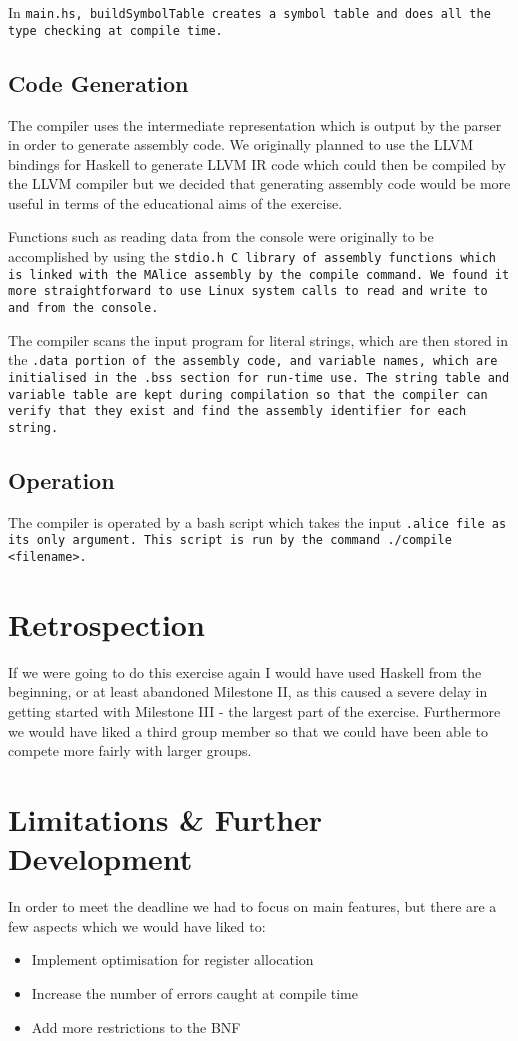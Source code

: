 \documentclass[11pt]{article}
\begin{document}
In \tt main.hs\rm, \tt buildSymbolTable \rm creates a symbol table and does all the type checking at compile time. 

\subsection{Code Generation}
The compiler uses the intermediate representation which is output by the parser in order to generate assembly code. We originally planned to use the LLVM bindings for Haskell to generate LLVM IR code which could then be compiled by the LLVM compiler but we decided that generating assembly code would be more useful in terms of the educational aims of the exercise.

Functions such as reading data from the console were originally to be accomplished by using the \tt stdio.h \rm C library of assembly functions which is linked with the MAlice assembly by the \tt compile \rm command. We found it more straightforward to use Linux system calls to read and write to and from the console.

The compiler scans the input program for literal strings, which are then stored in the \tt .data \rm portion of the assembly code, and variable names, which are initialised in the \tt .bss \rm section for run-time use. The string table and variable table are kept during compilation so that the compiler can verify that they exist and find the assembly identifier for each string.

\subsection{Operation}
The compiler is operated by a bash script which takes the input \tt .alice \rm file as its only argument. This script is run by the command \tt ./compile <filename>\rm .

\section{Retrospection}
If we were going to do this exercise again I would have used Haskell from the beginning, or at least abandoned Milestone II, as this caused a severe delay in getting started with Milestone III - the largest part of the exercise. Furthermore we would have liked a third group member so that we could have been able to compete more fairly with larger groups.

\section{Limitations \& Further Development}
In order to meet the deadline we had to focus on main features, but there are a few aspects which we would have liked to:

\begin{itemize}
\item Implement optimisation for register allocation
\item Increase the number of errors caught at compile time
\item Add more restrictions to the BNF
\end{itemize}
\end{document}
